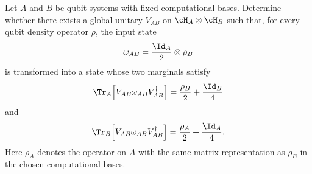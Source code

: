Let $A$ and $B$ be qubit systems with fixed computational bases. Determine whether there exists a global unitary $V_{AB}$ on $\cH_A\otimes\cH_B$ such that, for every qubit density operator $\rho$, the input state
$$
\omega_{AB}=\frac{\Id_A}{2}\otimes\rho_B
$$
is transformed into a state whose two marginals satisfy
$$
\Tr_A\!\left[V_{AB}\omega_{AB}V_{AB}^\dagger\right]
=
\frac{\rho_B}{2}+\frac{\Id_B}{4}
$$
and
$$
\Tr_B\!\left[V_{AB}\omega_{AB}V_{AB}^\dagger\right]
=
\frac{\rho_A}{2}+\frac{\Id_A}{4}.
$$
Here $\rho_A$ denotes the operator on $A$ with the same matrix representation as $\rho_B$ in the chosen computational bases.
